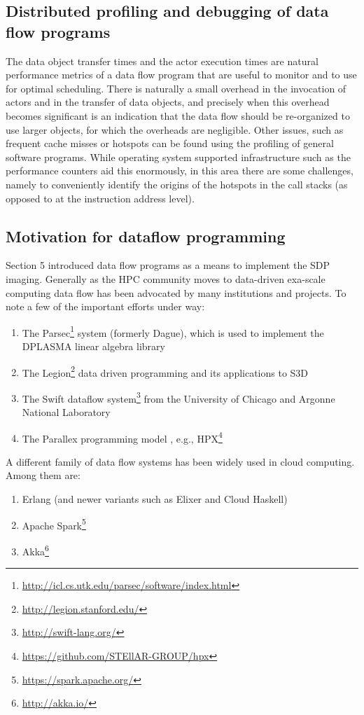 \documentclass[11pt,a4paper]{article}
\begin{document}
\subsection{Distributed profiling and debugging of data flow programs}

The data object transfer times and the actor execution times are
natural performance metrics of a data flow program that are useful to
monitor and to use for optimal scheduling.  There is naturally a small
overhead in the invocation of actors and in the transfer of data
objects, and precisely when this overhead becomes significant is an
indication that the data flow should be re-organized to use larger
objects, for which the overheads are negligible.  Other issues, such
as frequent cache misses or hotspots can be found using the profiling
of general software programs.  While operating system supported
infrastructure such as the performance counters aid this enormously,
in this area there are some challenges, namely to conveniently
identify the origins of the hotspots in the call stacks (as opposed to
at the instruction address level).

\subsection{Motivation for dataflow programming}

Section 5 introduced data flow programs as a means to implement the
SDP imaging.  Generally as the HPC community moves to data-driven
exa-scale computing data flow has been advocated by many institutions
and projects.  To note a few of the important efforts under way:

\begin{enumerate}
\item The
  Parsec\footnote{\url{http://icl.cs.utk.edu/parsec/software/index.html} }
  system (formerly Dague), which is used to implement the DPLASMA
  linear algebra library
 \item The Legion\footnote{\url{http://legion.stanford.edu/}{} } data
   driven programming and its applications to S3D
 \item The Swift dataflow system\footnote{\url{http://swift-lang.org/}
   } from the University of Chicago and Argonne National Laboratory
 \item The Parallex programming model \citep{Kaiser5364511}, e.g.,
   HPX\footnote{\url{https://github.com/STEllAR-GROUP/hpx} }
\end{enumerate}

A different family of data flow systems has been widely used in cloud
computing.  Among them are:
\begin{enumerate}
  \item Erlang (and newer variants such as Elixer and Cloud Haskell)
  \item Apache Spark\footnote{\url{https://spark.apache.org/} }
  \item Akka\footnote{\url{http://akka.io/} }
\end{enumerate}
\end{document}
